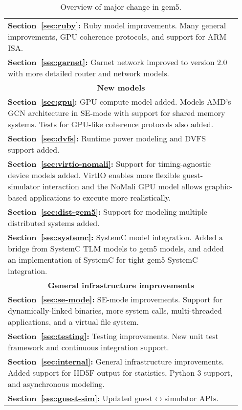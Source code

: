 \begin{table}
\begin{tabular}{|p{0.95\linewidth}|}
        \textbf{Section~\ref{sec:ruby}:} Ruby model improvements. Many general improvements, GPU coherence protocols, and support for ARM ISA. \\
        \textbf{Section~\ref{sec:garnet}:} Garnet network improved to version 2.0 with more detailed router and network models. \\
        \hline \hline
        \multicolumn{1}{|c|}{\textbf{New models} } \\
        \hline
        \textbf{Section~\ref{sec:gpu}:} GPU compute model added. Models AMD's GCN architecture in SE-mode with support for shared memory systems. Tests for GPU-like coherence protocols also added. \\
        \textbf{Section~\ref{sec:dvfs}:} Runtime power modeling and DVFS support added. \\
        \textbf{Section~\ref{sec:virtio-nomali}:} Support for timing-agnostic device models added. VirtIO enables more flexible guest-simulator interaction and the NoMali GPU model allows graphic-based applications to execute more realistically. \\
        \textbf{Section~\ref{sec:dist-gem5}:} Support for modeling multiple distributed systems added. \\
        \textbf{Section~\ref{sec:systemc}:} SystemC model integration. Added a bridge from SystemC TLM models to gem5 models, and added an implementation of SystemC for tight gem5-SystemC integration. \\
        \hline \hline
        \multicolumn{1}{|c|}{\textbf{General infrastructure improvements} } \\
        \hline
        \textbf{Section~\ref{sec:se-mode}:} SE-mode improvements. Support for dynamically-linked binaries, more system calls, multi-threaded applications, and a virtual file system. \\
        \textbf{Section~\ref{sec:testing}:} Testing improvements. New unit test framework and continuous integration support. \\
        \textbf{Section~\ref{sec:internal}:} General infrastructure improvements. Added support for HD5F output for statistics, Python 3 support, and asynchronous modeling. \\
        \textbf{Section~\ref{sec:guest-sim}:} Updated guest$\leftrightarrow$simulator APIs. \\
        \hline
    \end{tabular}
    \caption{Overview of major change in gem5.}
    \label{table:overview}
\end{table}

